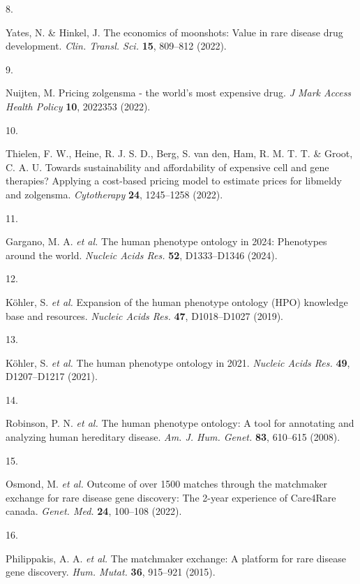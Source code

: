 \documentclass[
]{agujournal2019}
\newlength{\cslhangindent}
\newlength{\csllabelwidth}
\newenvironment{CSLReferences}[2] %
 {\begin{list}{}{%
  \setlength{\itemindent}{0pt}
  \setlength{\leftmargin}{0pt}
  \setlength{\parsep}{0pt}
  \ifodd #1
   \setlength{\leftmargin}{\cslhangindent}
   \setlength{\itemindent}{-1\cslhangindent}
  \fi
  \setlength{\itemsep}{#2\baselineskip}}}
 {\end{list}}
\newcommand{\CSLLeftMargin}[1]{\parbox[t]{\csllabelwidth}{\strut#1\strut}}
\newcommand{\CSLRightInline}[1]{\parbox[t]{\linewidth - \csllabelwidth}{\strut#1\strut}}
\begin{document}
\begin{CSLReferences}{0}{0}
\CSLLeftMargin{8. }%
\CSLRightInline{Yates, N. \& Hinkel, J. The economics of moonshots:
Value in rare disease drug development. \emph{Clin. Transl. Sci.}
\textbf{15}, 809--812 (2022).}

\CSLLeftMargin{9. }%
\CSLRightInline{Nuijten, M. Pricing zolgensma - the world's most
expensive drug. \emph{J Mark Access Health Policy} \textbf{10}, 2022353
(2022).}

\CSLLeftMargin{10. }%
\CSLRightInline{Thielen, F. W., Heine, R. J. S. D., Berg, S. van den,
Ham, R. M. T. T. \& Groot, C. A. U. Towards sustainability and
affordability of expensive cell and gene therapies? Applying a
cost-based pricing model to estimate prices for libmeldy and zolgensma.
\emph{Cytotherapy} \textbf{24}, 1245--1258 (2022).}

\CSLLeftMargin{11. }%
\CSLRightInline{Gargano, M. A. \emph{et al.} The human phenotype
ontology in 2024: Phenotypes around the world. \emph{Nucleic Acids Res.}
\textbf{52}, D1333--D1346 (2024).}

\CSLLeftMargin{12. }%
\CSLRightInline{Köhler, S. \emph{et al.} Expansion of the human
phenotype ontology ({HPO}) knowledge base and resources. \emph{Nucleic
Acids Res.} \textbf{47}, D1018--D1027 (2019).}

\CSLLeftMargin{13. }%
\CSLRightInline{Köhler, S. \emph{et al.} The human phenotype ontology in
2021. \emph{Nucleic Acids Res.} \textbf{49}, D1207--D1217 (2021).}

\CSLLeftMargin{14. }%
\CSLRightInline{Robinson, P. N. \emph{et al.} The human phenotype
ontology: A tool for annotating and analyzing human hereditary disease.
\emph{Am. J. Hum. Genet.} \textbf{83}, 610--615 (2008).}

\CSLLeftMargin{15. }%
\CSLRightInline{Osmond, M. \emph{et al.} Outcome of over 1500 matches
through the matchmaker exchange for rare disease gene discovery: The
2-year experience of {Care4Rare} canada. \emph{Genet. Med.} \textbf{24},
100--108 (2022).}

\CSLLeftMargin{16. }%
\CSLRightInline{Philippakis, A. A. \emph{et al.} The matchmaker
exchange: A platform for rare disease gene discovery. \emph{Hum. Mutat.}
\textbf{36}, 915--921 (2015).}


\end{CSLReferences}
\end{document}
